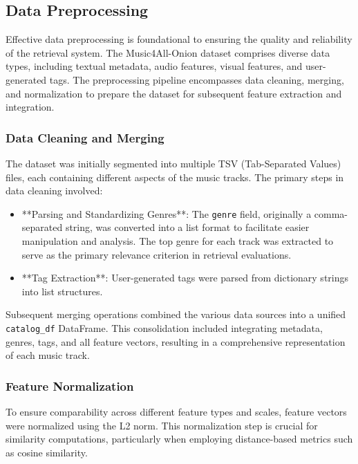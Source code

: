 \documentclass[sigconf]{acmart}
\begin{document}
\subsection{Data Preprocessing}
\label{subsec:data_preprocessing}

Effective data preprocessing is foundational to ensuring the quality and reliability of the retrieval system. The Music4All-Onion dataset comprises diverse data types, including textual metadata, audio features, visual features, and user-generated tags. The preprocessing pipeline encompasses data cleaning, merging, and normalization to prepare the dataset for subsequent feature extraction and integration.

\subsubsection{Data Cleaning and Merging}

The dataset was initially segmented into multiple TSV (Tab-Separated Values) files, each containing different aspects of the music tracks. The primary steps in data cleaning involved:

\begin{itemize}
    \item **Parsing and Standardizing Genres**: The \texttt{genre} field, originally a comma-separated string, was converted into a list format to facilitate easier manipulation and analysis. The top genre for each track was extracted to serve as the primary relevance criterion in retrieval evaluations.
    \item **Tag Extraction**: User-generated tags were parsed from dictionary strings into list structures.
\end{itemize}

Subsequent merging operations combined the various data sources into a unified \texttt{catalog\_df} DataFrame. This consolidation included integrating metadata, genres, tags, and all feature vectors, resulting in a comprehensive representation of each music track.

\subsubsection{Feature Normalization}

To ensure comparability across different feature types and scales, feature vectors were normalized using the L2 norm. This normalization step is crucial for similarity computations, particularly when employing distance-based metrics such as cosine similarity.
\end{document}

